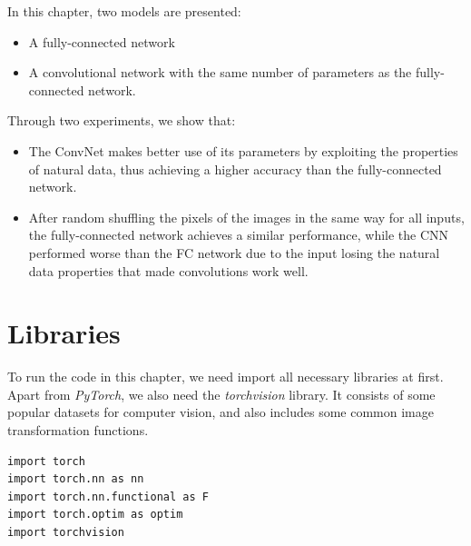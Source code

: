    In this chapter, two models are presented:
    \begin{itemize}
        \item A fully-connected network 
        \item A convolutional network with the same number of parameters as the fully-connected network.
    \end{itemize}
    Through two experiments, we show that:
    \begin{itemize}
        \item The ConvNet makes better use of its parameters by exploiting the properties of natural data, thus achieving a higher accuracy than the fully-connected network.
        \item After random shuffling the pixels of the images in the same way for all inputs, the fully-connected network achieves a similar performance, while the CNN performed worse than the FC network due to the input losing the natural data properties that made convolutions work well.
    \end{itemize}

    \section{Libraries}
    To run the code in this chapter, we need import all necessary libraries at first.
    Apart from \emph{PyTorch}, we also need the \emph{torchvision} library.
    It consists of some popular datasets for computer vision, and also includes some common image transformation functions.
    \begin{verbatim}
import torch
import torch.nn as nn
import torch.nn.functional as F
import torch.optim as optim
import torchvision
    \end{verbatim}

